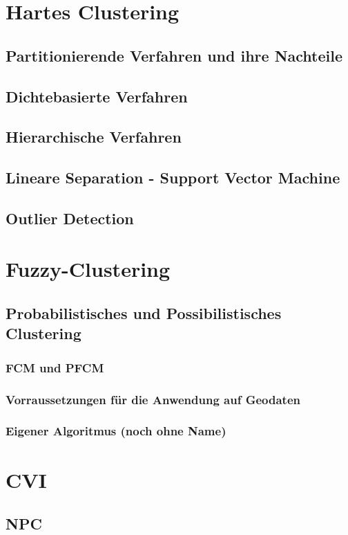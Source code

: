 \documentclass[11pt,fleqn]{book}
\begin{document}
\section{Hartes Clustering}
\subsection{Partitionierende Verfahren und ihre Nachteile}
\subsection{Dichtebasierte Verfahren}
\subsection{Hierarchische Verfahren}
\subsection{Lineare Separation - Support Vector Machine}
\subsection{Outlier Detection}


\section{Fuzzy-Clustering}
\subsection{Probabilistisches und Possibilistisches Clustering}
\subsubsection{FCM und PFCM}
\subsubsection{Vorraussetzungen für die Anwendung auf Geodaten}
\subsubsection{Eigener Algoritmus (noch ohne Name)}

\section{CVI}
\subsection{NPC}
\end{document}
